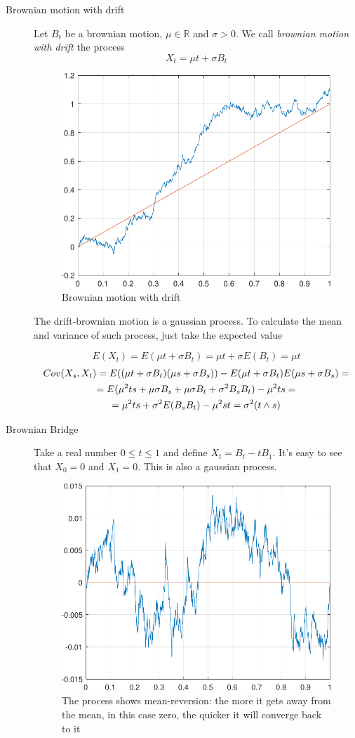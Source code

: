 \begin{description}
    \item[Brownian motion with drift] Let $B_t$ be a brownian motion, $\mu \in \mathbb{R}$ and $\sigma > 0$. We call \textit{brownian motion with drift} the process 
    \begin{equation}
        X_t = \mu t + \sigma B_t
    \end{equation}

    \begin{figure}[h!]
        \centering
        \includegraphics[width=0.5\linewidth]{assets/drift.pdf}
        \caption{Brownian motion with drift}
        \label{fig:drift}
    \end{figure}

    The drift-brownian motion is a gaussian process. To calculate the mean and variance of such process, just take the expected value

    \begin{equation}
        E(X_t) = E(\mu t + \sigma B_t) = \mu t + \sigma E(B_t) = \mu t
    \end{equation}
    \begin{gather}
        Cov(X_s, X_t) = E((\mu t + \sigma B_t)(\mu s + \sigma B_s)) - E(\mu t + \sigma B_t) E(\mu s + \sigma B_s) = \notag \\
        = E(\mu^2 t s + \mu \sigma B_s + \mu \sigma B_t + \sigma^2 B_s B_t) - \mu^2 ts = \notag \\
        = \mu^2 ts + \sigma^2 E(B_s B_t) - \mu^2 st = \sigma^2 (t \wedge s)
    \end{gather}
    \item[Brownian Bridge] Take a real number $0 \leq t \leq 1$ and define $X_t = B_t - tB_1$. It's easy to see that $X_0 = 0$ and $X_1 = 0$. This is also a gaussian process.

    \begin{figure}[h!]
        \centering
        \includegraphics[width=0.5\linewidth]{assets/bridge.pdf}
        \caption{The process shows mean-reversion: the more it gets away from the mean, in this case zero, the quicker it will converge back to it}
        \label{fig:bridge}
    \end{figure}


\end{description}
